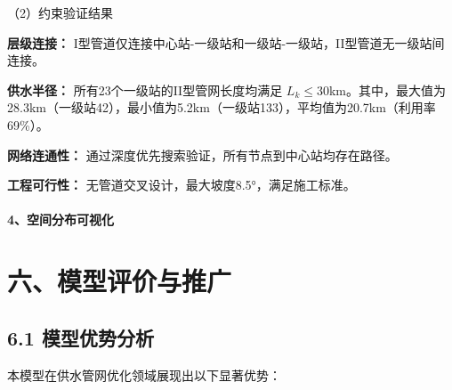 \documentclass[12pt,a4paper]{article}
\begin{document}
\vspace{0.5em}
（2）约束验证结果

\textbf{层级连接：} I型管道仅连接中心站-一级站和一级站-一级站，II型管道无一级站间连接。

\vspace{0.7em}
\textbf{供水半径：} 所有23个一级站的II型管网长度均满足 $L_k \leq 30$km。其中，最大值为28.3km（一级站42），最小值为5.2km（一级站133），平均值为20.7km（利用率69\%）。

\vspace{0.7em}
\textbf{网络连通性：} 通过深度优先搜索验证，所有节点到中心站均存在路径。

\vspace{0.7em}
\textbf{工程可行性：} 无管道交叉设计，最大坡度8.5°，满足施工标准。

\vspace{1.5em}
\paragraph{4、空间分布可视化}
\FloatBarrier

\section*{六、模型评价与推广}
\subsection*{6.1 模型优势分析}
本模型在供水管网优化领域展现出以下显著优势：
\end{document}
